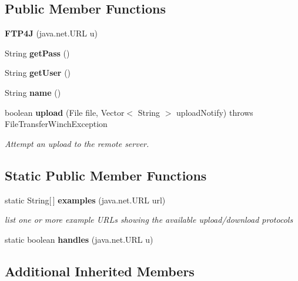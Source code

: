 \subsection*{Public Member Functions}
\begin{DoxyCompactItemize}
\item 
{\bfseries F\-T\-P4\-J} (java.\-net.\-U\-R\-L u)\label{classorg_1_1smallfoot_1_1filexfer_1_1FTP4J_ad5bd367701ec46e8d0ba3f0ae3d83cae}

\item 
String {\bfseries get\-Pass} ()\label{classorg_1_1smallfoot_1_1filexfer_1_1FTP4J_a6cba30c67b9a7c8d4750e7e3108961c6}

\item 
String {\bfseries get\-User} ()\label{classorg_1_1smallfoot_1_1filexfer_1_1FTP4J_af8214ba89d8ad71194a2d69bea5cb808}

\item 
String {\bfseries name} ()\label{classorg_1_1smallfoot_1_1filexfer_1_1FTP4J_afa2149aced9d90555f788dfc81c23d15}

\item 
boolean {\bf upload} (File file, Vector$<$ String $>$ upload\-Notify)  throws File\-Transfer\-Winch\-Exception     
\begin{DoxyCompactList}\small\item\em Attempt an upload to the remote server. \end{DoxyCompactList}\end{DoxyCompactItemize}
\subsection*{Static Public Member Functions}
\begin{DoxyCompactItemize}
\item 
static String[$\,$] {\bf examples} (java.\-net.\-U\-R\-L url)
\begin{DoxyCompactList}\small\item\em list one or more example U\-R\-Ls showing the available upload/download protocols \end{DoxyCompactList}\item 
static boolean {\bfseries handles} (java.\-net.\-U\-R\-L u)\label{classorg_1_1smallfoot_1_1filexfer_1_1FTP4J_a4ef8d35ab128080eb511f7e26cd7ab7b}

\end{DoxyCompactItemize}
\subsection*{Additional Inherited Members}


